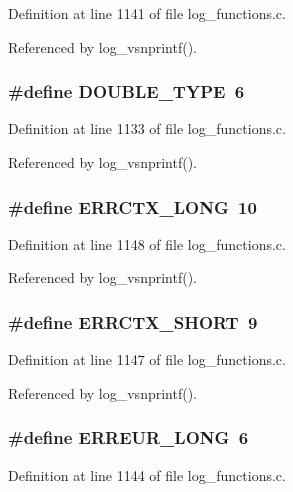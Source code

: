 Definition at line 1141 of file log\_\-functions.c.

Referenced by log\_\-vsnprintf().
\subsubsection{\setlength{\rightskip}{0pt plus 5cm}\#define DOUBLE\_\-TYPE\ 6}\label{log__functions_8c_a15}




Definition at line 1133 of file log\_\-functions.c.

Referenced by log\_\-vsnprintf().
\subsubsection{\setlength{\rightskip}{0pt plus 5cm}\#define ERRCTX\_\-LONG\ 10}\label{log__functions_8c_a27}




Definition at line 1148 of file log\_\-functions.c.

Referenced by log\_\-vsnprintf().
\subsubsection{\setlength{\rightskip}{0pt plus 5cm}\#define ERRCTX\_\-SHORT\ 9}\label{log__functions_8c_a26}




Definition at line 1147 of file log\_\-functions.c.

Referenced by log\_\-vsnprintf().
\subsubsection{\setlength{\rightskip}{0pt plus 5cm}\#define ERREUR\_\-LONG\ 6}\label{log__functions_8c_a23}




Definition at line 1144 of file log\_\-functions.c.

